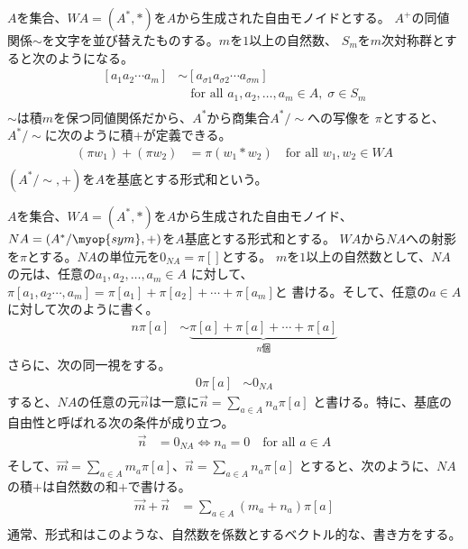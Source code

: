 	\begin{definition}[形式和]\label{def:形式和} %
		$A$を集合、$WA=(A^*,*)$を$A$から生成された自由モノイドとする。
		$A^+$の同値関係$\sim$を文字を並び替えたものする。$m$を$1$以上の自然数、
		$S_m$を$m$次対称群とすると次のようになる。
		\begin{equation}\begin{split} %
			[a_1a_2\cdots a_m] &\sim [a_{\sigma 1}a_{\sigma 2}\cdots a_{\sigma m}] \\
			&\quad\text{for all }a_1,a_2,\dots,a_m\in A,\;\sigma\in S_m \\
		\end{split}\end{equation} %
		$\sim$は積$m$を保つ同値関係だから、$A^*$から商集合$A^*/\sim$への写像を
		$\pi$とすると、$A^*/\sim$に次のように積$+$が定義できる。
		\begin{equation*}\begin{split} %
			(\pi w_1)+(\pi w_2) &= \pi(w_1*w_2) \quad\text{for all }w_1,w_2\in WA \\
		\end{split}\end{equation*} %
		$(A^*/\sim,+)$を$A$を基底とする形式和という。
	\end{definition} %

	$A$を集合、$WA=(A^*,*)$を$A$から生成された自由モノイド、
	$NA=(A^*/\myop{sym},+)$を$A$基底とする形式和とする。
	$WA$から$NA$への射影を$\pi$とする。$NA$の単位元を$0_{NA}=\pi[]$とする。
	$m$を$1$以上の自然数として、$NA$の元は、任意の$a_1,a_2,\dots,a_m\in A$
	に対して、$\pi[a_1,a_2\cdots,a_m]=\pi[a_1]+\pi[a_2]+\cdots+\pi[a_m]$と
	書ける。そして、任意の$a\in A$に対して次のように書く。
	\begin{equation}\begin{split} %
		n\pi[a] &\sim \underbrace{\pi[a]+\pi[a]+\cdots+\pi[a]}_{n\text{個}}
	\end{split}\end{equation} %
	さらに、次の同一視をする。
	\begin{equation}\begin{split} %
		0\pi[a] &\sim 0_{NA}
	\end{split}\end{equation} %
	すると、$NA$の任意の元$\vec{n}$は一意に$\vec{n}=\sum_{a\in A}n_a\pi[a]$
	と書ける。特に、基底の自由性と呼ばれる次の条件が成り立つ。
	\begin{equation*}\begin{split} %
		\vec{n} &= 0_{NA} \Leftrightarrow n_a=0 \quad\text{for all }a\in A \\
	\end{split}\end{equation*} %
	そして、$\vec{m}=\sum_{a\in A}m_a\pi[a]$、$\vec{n}=\sum_{a\in A}n_a\pi[a]$
	とすると、次のように、$NA$の積$+$は自然数の和$+$で書ける。
	\begin{equation*}\begin{split} %
		\vec{m}+\vec{n} &= \sum_{a\in A}(m_a+n_a)\pi[a] \\
	\end{split}\end{equation*} %
	通常、形式和はこのような、自然数を係数とするベクトル的な、書き方をする。

